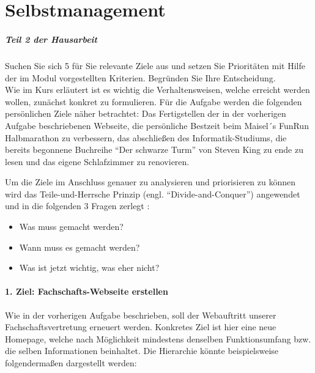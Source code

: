 %
\chapter{Selbstmanagement}
\label{sec:selbstmanagement}

\paragraph{Teil 2 der Hausarbeit}
Suchen Sie sich 5 für Sie relevante Ziele aus und setzen Sie Prioritäten mit Hilfe der im Modul vorgestellten Kriterien. Begründen Sie Ihre Entscheidung. \\[0.4em]

Wie im Kurs erläutert ist es wichtig die Verhaltensweisen, welche erreicht werden wollen, zunächst konkret zu formulieren. Für die Aufgabe werden die folgenden persönlichen Ziele näher betrachtet: Das Fertigstellen der in der vorherigen Aufgabe beschriebenen Webseite, die persönliche Bestzeit beim Maisel´s FunRun Halbmarathon zu verbessern, das abschließen des Informatik-Studiums, die bereits begonnene Buchreihe “Der schwarze Turm” von Steven King zu ende zu lesen und das eigene Schlafzimmer zu renovieren.

Um die Ziele im Anschluss genauer zu analysieren und priorisieren zu können wird das Teile-und-Herrsche Prinzip (engl. “Divide-and-Conquer”) angewendet und in die folgenden 3 Fragen zerlegt \cite{WEB:VHB:LuSt1:Zielhierarchien}:

\begin{itemize}
    \item Was muss gemacht werden?
    \item Wann muss es gemacht werden?
    \item Was ist jetzt wichtig, was eher nicht?
\end{itemize}

\subsubsection{1. Ziel: Fachschafts-Webseite erstellen}
Wie in der vorherigen Aufgabe beschrieben, soll der Webauftritt unserer Fachschaftsvertretung erneuert werden. Konkretes Ziel ist hier eine neue Homepage, welche nach Möglichkeit mindestens denselben Funktionsumfang bzw. die selben Informationen beinhaltet.
Die Hierarchie könnte beispielsweise folgendermaßen dargestellt werden:

